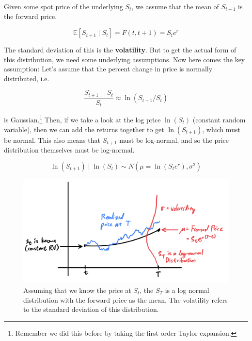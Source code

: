 \documentclass{article}
\begin{document}
    Given some spot price of the underlying $S_t$, we assume that the mean of $S_{t + 1}$ is the forward price. 

    \begin{equation}
      \mathbb{E}[S_{t+1} \mid S_t] = F(t, t+1) = S_t e^{r} 
    \end{equation} 

    The standard deviation of this is the \textbf{volatility}. But to get the actual form of this distribution, we need some underlying assumptions. Now here comes the key assumption: Let's assume that the percent change in price is normally distributed, i.e. 

    \begin{equation}
      \frac{S_{t + 1} - S_t}{S_t} \approx \ln(S_{t + 1} / S_t) 
    \end{equation}

    is Gaussian.\footnote{Remember we did this before by taking the first order Taylor expansion.} Then, if we take a look at the log price $\ln(S_t)$ (constant random variable), then we can add the returns together to get $\ln(S_{t + 1})$, which must be normal. This also means that $S_{t+1}$ must be log-normal, and so the price distribution themselves must be log-normal. 

    \begin{equation}
      \ln(S_{t + 1}) \mid \ln(S_t) \sim N(\mu = \ln(S_t e^r), \sigma^2)
    \end{equation}

    \begin{figure}[H]
      \centering 
      \includegraphics[scale=0.5]{img/distribution_of_S_T.png}
      \caption{Assuming that we know the price at $S_t$, the $S_T$ is a log normal distribution with the forward price as the mean. The volatility refers to the standard deviation of this distribution. } 
      \label{fig:distribution_of_S_T}
    \end{figure}
\end{document}

